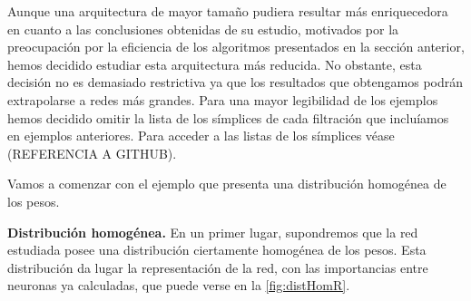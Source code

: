 \documentclass[12pt, a4paper, twoside]{book}
\numberwithin{equation}{section}
\theoremstyle{definition}
\newenvironment{ejem}
  {\pushQED{\qed}\renewcommand{\qedsymbol}{$\blacktriangleleft$}\ejemplo}
  {\popQED\endejemplo}
\theoremstyle{remark}
\theoremstyle{plain}
\begin{document}
	Aunque una arquitectura de mayor tamaño pudiera resultar más 
	enriquecedora en 
	cuanto a las conclusiones obtenidas de su estudio, motivados por la 
	preocupación por la eficiencia de los algoritmos presentados en la 
	sección anterior, hemos decidido estudiar esta arquitectura más 
	reducida. No obstante, esta decisión no es demasiado restrictiva ya 
	que los resultados que obtengamos podrán extrapolarse a redes más 
	grandes. Para una mayor legibilidad de los ejemplos hemos decidido 
	omitir la lista de los símplices de cada filtración que incluíamos en 
	ejemplos anteriores. Para acceder a las listas de los símplices véase 
	(REFERENCIA A GITHUB).

	Vamos a comenzar con el ejemplo que presenta una distribución 
	homogénea de los pesos.

	\begin{ejem}\textbf{Distribución homogénea.}
	En un primer lugar, supondremos que la red estudiada posee una 
	distribución ciertamente homogénea de los pesos. Esta distribución da 
	lugar la representación de la red, con las importancias entre neuronas
	ya calculadas, que puede verse en la \autoref{fig:distHomR}.
	
	\begin{figure}[!htbp]
			\centering
\end{figure}
\end{ejem}
\end{document}
